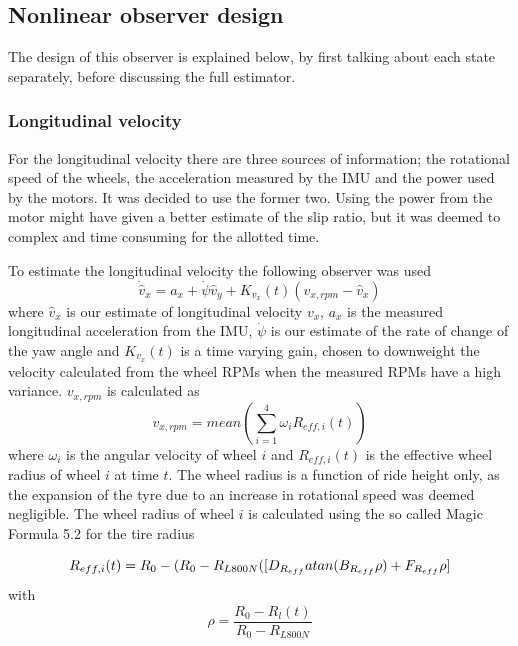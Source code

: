 \subsection{Nonlinear observer design}

The design of this observer is explained below, by first talking about each state separately, before discussing the full estimator.

\subsubsection{Longitudinal velocity}
For the longitudinal velocity there are three sources of information; the rotational speed of the wheels, the acceleration measured by the \gls{IMU} and the power used by the motors. It was decided to use the former two. Using the power from the motor might have given a better estimate of the slip ratio, but it was deemed to complex and time consuming for the allotted time. 

To estimate the longitudinal velocity the following observer was used
\begin{equation}
    \dot{\hat{v}}_x = a_x + \dot{\psi}\hat{v}_y + K_{v_x}(t)(v_{x,rpm} - \hat{v}_x)
\end{equation}
where $\hat{v}_x$ is our estimate of longitudinal velocity $v_x$, $a_x$ is the measured longitudinal acceleration from the IMU, $\dot{\psi}$ is our estimate of the rate of change of the yaw angle and $K_{v_x}(t)$ is a time varying gain, chosen to downweight the velocity calculated from the wheel \glspl{RPM} when the measured \glspl{RPM} have a high variance. $v_{x,rpm}$ is calculated as 
\begin{equation}
    v_{x,rpm} = mean(\sum_{i=1}^{4} \omega_{i}R_{eff,i}(t))
\end{equation}
where $\omega_i$ is the angular velocity of wheel $i$ and $R_{eff,i}(t)$ is the effective wheel radius of wheel $i$ at time $t$. The wheel radius is a function of ride height only, as the expansion of the tyre due to an increase in rotational speed was deemed negligible. The wheel radius of wheel $i$ is calculated using the so called Magic Formula 5.2 for the tire radius \cite{MagicFormula5_2}

\begin{equation}
    R_{eff,i}(t) = R_0 - (R_0-R_{L800N}([D_{R_{eff}}atan(B_{R_{eff}}\rho) + \\ F_{R_{eff}}\rho]
\end{equation}
with
\begin{equation}
    \rho = \frac{R_0-R_l(t)}{R_0-R_{L800N}}
\end{equation}

